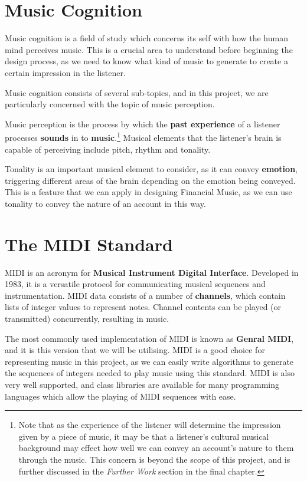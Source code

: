 \section{Music Cognition}

Music cognition is a field of study which concerns its self with how the human mind perceives music. This is a crucial area to understand before beginning the design process, as we need to know what kind of music to generate to create a certain impression in the listener.

Music cognition consists of several sub-topics, and in this project, we are particularly concerned with the topic of music perception.

Music perception is the process by which the \textbf{past experience} of a listener processes \textbf{sounds} in to \textbf{music}.\footnote{Note that as the experience of the listener will determine the impression given by a piece of music, it may be that a listener's cultural musical background may effect how well we can convey an account's nature to them through the music. This concern is beyond the scope of this project, and is further discussed in the \textit{Further Work} section in the final chapter.} Musical elements that the listener's brain is capable of perceiving include pitch, rhythm and tonality.

Tonality is an important musical element to consider, as it can convey \textbf{emotion}, triggering different areas of the brain depending on the emotion being conveyed. This is a feature that we can apply in designing Financial Music, as we can use tonality to convey the nature of an account in this way.

\section{The MIDI Standard}

MIDI is an acronym for \textbf{Musical Instrument Digital Interface}. Developed in 1983, it is a versatile protocol for communicating musical sequences and instrumentation. MIDI data consists of a number of \textbf{channels}, which contain lists of integer values to represent notes. Channel contents can be played (or transmitted) concurrently, resulting in music.

The most commonly used implementation of MIDI is known as \textbf{Genral MIDI}, and it is this version that we will be utilising. MIDI is a good choice for representing music in this project, as we can easily write algorithms to generate the sequences of integers needed to play music using this standard. MIDI is also very well supported, and class libraries are available for many programming languages which allow the playing of MIDI sequences with ease.

